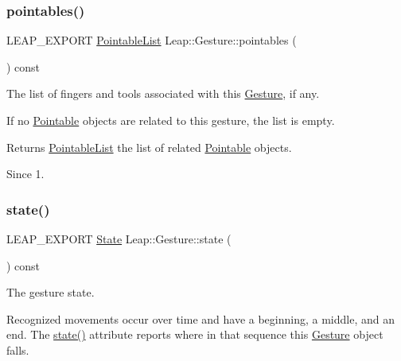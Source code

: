 \subsubsection{\texorpdfstring{pointables()}{pointables()}}
{\footnotesize\ttfamily L\+E\+A\+P\+\_\+\+E\+X\+P\+O\+RT \hyperlink{class_leap_1_1_pointable_list}{Pointable\+List} Leap\+::\+Gesture\+::pointables (\begin{DoxyParamCaption}{ }\end{DoxyParamCaption}) const}

The list of fingers and tools associated with this \hyperlink{class_leap_1_1_gesture}{Gesture}, if any.

If no \hyperlink{class_leap_1_1_pointable}{Pointable} objects are related to this gesture, the list is empty.


\begin{DoxyCodeInclude}
\end{DoxyCodeInclude}


\begin{DoxyReturn}{Returns}
\hyperlink{class_leap_1_1_pointable_list}{Pointable\+List} the list of related \hyperlink{class_leap_1_1_pointable}{Pointable} objects. 
\end{DoxyReturn}
\begin{DoxySince}{Since}
1. 
\end{DoxySince}
\mbox{\label{class_leap_1_1_gesture_ac33a8d4a3c01926ba8115e1706ba6c61}} 
\subsubsection{\texorpdfstring{state()}{state()}}
{\footnotesize\ttfamily L\+E\+A\+P\+\_\+\+E\+X\+P\+O\+RT \hyperlink{class_leap_1_1_gesture_a068c6f3ba05970dc557b62a366073578}{State} Leap\+::\+Gesture\+::state (\begin{DoxyParamCaption}{ }\end{DoxyParamCaption}) const}

The gesture state.

Recognized movements occur over time and have a beginning, a middle, and an end. The \textquotesingle{}\hyperlink{class_leap_1_1_gesture_ac33a8d4a3c01926ba8115e1706ba6c61}{state()}\textquotesingle{} attribute reports where in that sequence this \hyperlink{class_leap_1_1_gesture}{Gesture} object falls.



